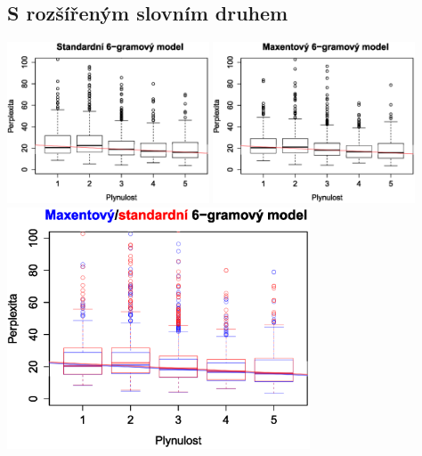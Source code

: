 \documentclass[12pt,a4paper]{report}
\begin{document}
\subsection{S rozšířeným slovním druhem}
\begin{center}
	\includegraphics[width=60mm]{./grafy/morf/ngram/rsd+rod.svg.eps}
	\includegraphics[width=60mm]{./grafy/morf/maxent/rsd+rod.svg.eps}
	\includegraphics[width=90mm]{./grafy/morf/porovnani/rsd+rod.svg.eps}	
\end{center}
\end{document}
